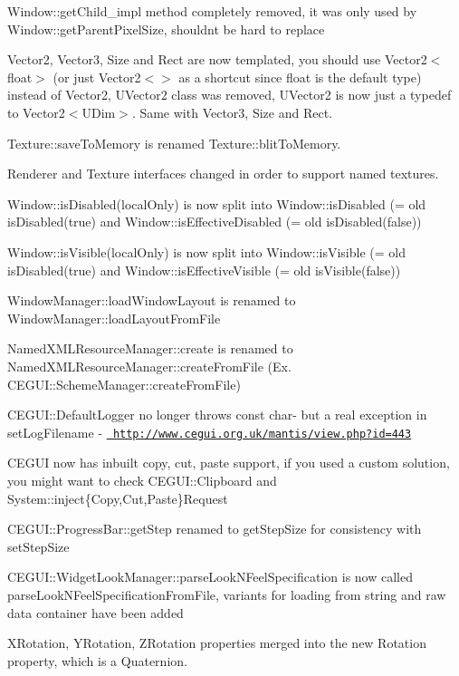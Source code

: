 \begin{DoxyItemize}
\item Window\+::get\+Child\+\_\+impl method completely removed, it was only used by Window\+::get\+Parent\+Pixel\+Size, shouldn\textquotesingle{}t be hard to replace
\item Vector2, Vector3, Size and Rect are now templated, you should use Vector2$<$float$>$ (or just Vector2$<$$>$ as a shortcut since float is the default type) instead of Vector2, U\+Vector2 class was removed, U\+Vector2 is now just a typedef to Vector2$<$\+U\+Dim$>$. Same with Vector3, Size and Rect.
\item Texture\+::save\+To\+Memory is renamed Texture\+::blit\+To\+Memory.
\item Renderer and Texture interfaces changed in order to support named textures.
\item Window\+::is\+Disabled(local\+Only) is now split into Window\+::is\+Disabled (= old is\+Disabled(true) and Window\+::is\+Effective\+Disabled (= old is\+Disabled(false))
\item Window\+::is\+Visible(local\+Only) is now split into Window\+::is\+Visible (= old is\+Disabled(true) and Window\+::is\+Effective\+Visible (= old is\+Visible(false))
\item Window\+Manager\+::load\+Window\+Layout is renamed to Window\+Manager\+::load\+Layout\+From\+File
\item Named\+X\+M\+L\+Resource\+Manager\+::create is renamed to Named\+X\+M\+L\+Resource\+Manager\+::create\+From\+File (Ex. C\+E\+G\+U\+I\+::\+Scheme\+Manager\+::create\+From\+File)
\item C\+E\+G\+U\+I\+::\+Default\+Logger no longer throws const char-\/ but a real exception in set\+Log\+Filename -\/ \href{http://www.cegui.org.uk/mantis/view.php?id=443}{\texttt{ http\+://www.\+cegui.\+org.\+uk/mantis/view.\+php?id=443}}
\item C\+E\+G\+UI now has inbuilt copy, cut, paste support, if you used a custom solution, you might want to check C\+E\+G\+U\+I\+::\+Clipboard and System\+::inject\{Copy,Cut,Paste\}Request
\item C\+E\+G\+U\+I\+::\+Progress\+Bar\+::get\+Step renamed to get\+Step\+Size for consistency with set\+Step\+Size
\item C\+E\+G\+U\+I\+::\+Widget\+Look\+Manager\+::parse\+Look\+N\+Feel\+Specification is now called parse\+Look\+N\+Feel\+Specification\+From\+File, variants for loading from string and raw data container have been added
\item X\+Rotation, Y\+Rotation, Z\+Rotation properties merged into the new Rotation property, which is a Quaternion.
\end{DoxyItemize}

